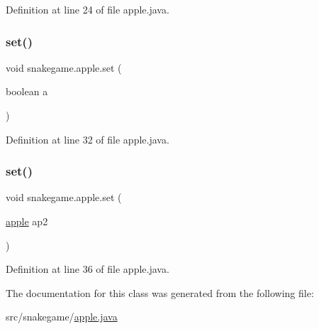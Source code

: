 Definition at line 24 of file apple.\+java.

\mbox{\label{classsnakegame_1_1apple_a4868669a889a955b0811141726005a23}} 
\subsubsection{\texorpdfstring{set()}{set()}\hspace{0.1cm}{\footnotesize\ttfamily [2/3]}}
{\footnotesize\ttfamily void snakegame.\+apple.\+set (\begin{DoxyParamCaption}\item[{boolean}]{a }\end{DoxyParamCaption})}



Definition at line 32 of file apple.\+java.

\mbox{\label{classsnakegame_1_1apple_aa14da591e5ca8e5ce41da4ace3dfd8af}} 
\subsubsection{\texorpdfstring{set()}{set()}\hspace{0.1cm}{\footnotesize\ttfamily [3/3]}}
{\footnotesize\ttfamily void snakegame.\+apple.\+set (\begin{DoxyParamCaption}\item[{\mbox{\hyperlink{classsnakegame_1_1apple}{apple}}}]{ap2 }\end{DoxyParamCaption})}



Definition at line 36 of file apple.\+java.



The documentation for this class was generated from the following file\+:\begin{DoxyCompactItemize}
\item 
src/snakegame/\mbox{\hyperlink{apple_8java}{apple.\+java}}\end{DoxyCompactItemize}
